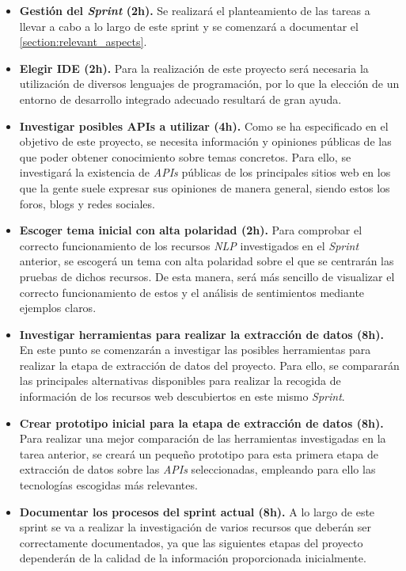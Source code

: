 \begin{itemize}

    \item \textbf{Gestión del \textit{Sprint} (2h).} Se realizará el planteamiento de las tareas a llevar a cabo a lo largo de este sprint y se comenzará a documentar el \autoref{section:relevant_aspects}.

    \item \textbf{Elegir IDE (2h).} Para la realización de este proyecto será necesaria la utilización de diversos lenguajes de programación, por lo que la elección de un entorno de desarrollo integrado adecuado resultará de gran ayuda.

    \item \textbf{Investigar posibles APIs a utilizar (4h).} Como se ha especificado en el objetivo de este proyecto, se necesita información y opiniones públicas de las que poder obtener conocimiento sobre temas concretos. Para ello, se investigará la existencia de \textit{APIs} públicas de los principales sitios web en los que la gente suele expresar sus opiniones de manera general, siendo estos los foros, blogs y redes sociales.

    \item \textbf{Escoger tema inicial con alta polaridad (2h).} Para comprobar el correcto funcionamiento de los recursos \textit{NLP} investigados en el \textit{Sprint} anterior, se escogerá un tema con alta polaridad sobre el que se centrarán las pruebas de dichos recursos. De esta manera, será más sencillo de visualizar el correcto funcionamiento de estos y el análisis de sentimientos mediante ejemplos claros.

    \item \textbf{Investigar herramientas para realizar la extracción de datos (8h).} En este punto se comenzarán a investigar las posibles herramientas para realizar la etapa de extracción de datos del proyecto. Para ello, se compararán las principales alternativas disponibles para realizar la recogida de información de los recursos web descubiertos en este mismo \textit{Sprint}.

    \item \textbf{Crear prototipo inicial para la etapa de extracción de datos (8h).} Para realizar una mejor comparación de las herramientas investigadas en la tarea anterior, se creará un pequeño prototipo para esta primera etapa de extracción de datos sobre las \textit{APIs} seleccionadas, empleando para ello las tecnologías escogidas más relevantes.

    \item \textbf{Documentar los procesos del sprint actual (8h).} A lo largo de este sprint se va a realizar la investigación de varios recursos que deberán ser correctamente documentados, ya que las siguientes etapas del proyecto dependerán de la calidad de la información proporcionada inicialmente.

\end{itemize}

